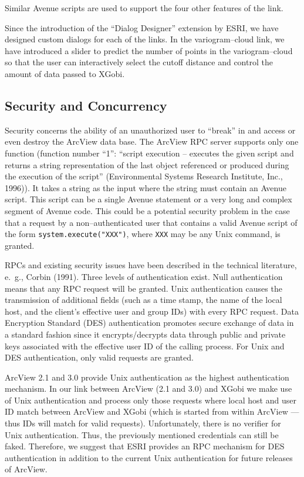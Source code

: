 \noindent
Similar Avenue scripts are used to support 
the four other features of the link. 

Since the introduction of the ``Dialog Designer'' extension by ESRI,
we have designed custom dialogs for each of the links. In the
variogram--cloud link, we have introduced a slider to predict the
number of points in the variogram--cloud so that the user can
interactively select the cutoff distance and control the amount of
data passed to XGobi. 


\subsection{Security and Concurrency}

Security concerns the ability of an unauthorized user to ``break'' in
and access or even destroy the ArcView data base.  The
ArcView RPC server supports only one function (function number
``1'': ``script execution -- executes the given script and returns a
string representation of the last object referenced or produced during
the execution of the script'' (Environmental Systems Research
Institute, Inc., 1996)).  
It takes a string as the input where the string must contain
an Avenue script. This script can be
a single Avenue statement or a very long and complex segment of
Avenue code. This could be a potential security problem in the
case that a request by a non--authenticated user
that contains a valid Avenue script of the form
\verb|system.execute("XXX")|, 
where \verb|XXX| may be any Unix command,
is granted.

RPCs and existing security issues have been described in the technical
literature, e.~g., Corbin (1991).  Three levels of authentication
exist. Null authentication means that any RPC request will
be granted. Unix authentication causes the
transmission of additional fields (such as a time stamp, the name of
the local host, and the client's effective user and group IDs) with every
RPC request.  Data Encryption Standard (DES) authentication promotes
secure exchange of data in a standard fashion since it
encrypts/decrypts data through public and private keys associated with
the effective user ID of the calling process. For Unix and DES
authentication, only valid requests are granted.  

ArcView 2.1 and 3.0 provide Unix authentication as the highest
authentication mechanism. In our link between ArcView (2.1 and 3.0) and XGobi
we make use of Unix authentication and process only those
requests where local host and user ID match between ArcView and XGobi
(which is started from within ArcView --- thus IDs will match for
valid requests).  Unfortunately, there is no verifier for Unix
authentication. Thus, the previously mentioned credentials can still
be faked. Therefore, we suggest
that ESRI provides an RPC mechanism for DES authentication in addition
to the current Unix authentication for future releases of
ArcView.

